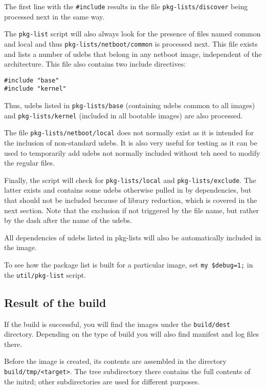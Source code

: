 \documentclass[a4paper,10pt]{article}
\begin{document}
The first line with the \texttt{\#include} results in the file \texttt{pkg-lists/discover} being processed next in the same way. 

The \texttt{pkg-list} script will also always look for the presence of files named common and local and thus \texttt{pkg-lists/netboot/common} is processed next. This file exists and lists a number of udebs that belong in any netboot image, independent of the architecture. This file also contains two include directives:

\begin{verbatim}
#include "base"
#include "kernel"
\end{verbatim}

Thus, udebs listed in \texttt{pkg-lists/base} (containing udebs common to all images) and \texttt{pkg-lists/kernel} (included in all bootable images) are also processed. 

The file \texttt{pkg-lists/netboot/local} does not normally exist as it is intended for the inclusion of non-standard udebs. It is also very useful for testing as it can be used to temporarily add udebs not normally included without teh need to modify the regular files. 

Finally, the script will check for \texttt{pkg-lists/local} and \texttt{pkg-lists/exclude}. The latter exists and contains some udebs otherwise pulled in by dependencies, but that should not be included because of library reduction, which is covered in the next section. Note that the exclusion if not triggered by the file name, but rather by the dash after the name of the udebs. 

All dependencies of udebs listed in pkg-lists will also be automatically included in the image. 

To see how the package list is built for a particular image, set \texttt{my \$debug=1;} in the \texttt{util/pkg-list} script. 


\subsection{Result of the build}
If the build is successful, you will find the images under the \texttt{build/dest} directory. Depending on the type of build you will also find manifest and log files there. 

Before the image is created, its contents are assembled in the directory \texttt{build/tmp/<target>}. The tree subdirectory there contains the full contents of the initrd; other subdirectories are used for different purposes. 
\end{document}
